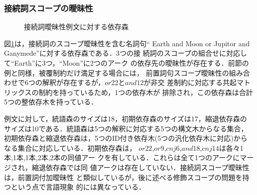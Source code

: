 \begin{comment}

\end{comment}

\subsubsection{接続詞スコープの曖昧性}

\begin{figure}[tb]
\begin{center}
\end{center}
\caption{接続詞曖昧性例文に対する依存森}
\label{fig:DFForEarthAndMoon}
\end{figure}

図\ref{fig:DFForEarthAndMoon}は，接続詞のスコープ曖昧性を含む名詞句``
Earth and Moon or Jupitor and Ganymede''に対する依存森である．3つの接
続詞のスコープの組合せに対応して``Earth''に3つ，``Moon''に2つのアーク
の依存先の曖昧性が存在する．前節の例と同様，被覆制約だけ満足する場合には，
前置詞句スコープ曖昧性の組み合わせで6つの解釈が存在するが，$or22$と$and12$が非交
差制約に対応する共起マトリックスの制約を持っているため，1つの依存木が
排除され，この依存森は合計5つの整依存木を持っている．

例文に対して，統語森のサイズは18，初期依存森のサイズは17，縮退依存森の
サイズは10である．統語森は5つの解釈に対応する5つの構文木からなる集合，
初期依存森と縮退依存森は，5つのID付き依存木(5つの汎化依存木に対応)から
なる集合に対応している．初期依存森は，
$or22$,$or9$,$cnj6$,$and18$,$cnj14$は各々1本,1本,1本,2本,2本の同値アー
クを有している．これらは全て1つのアークにマージされ，縮退依存森では同
値アークは存在していない．接続詞スコープ曖昧性は，前置詞付加曖昧性
と類似しているが，後に述べる修飾スコープの問題を持つという点で言語現象
的には異なっている．

